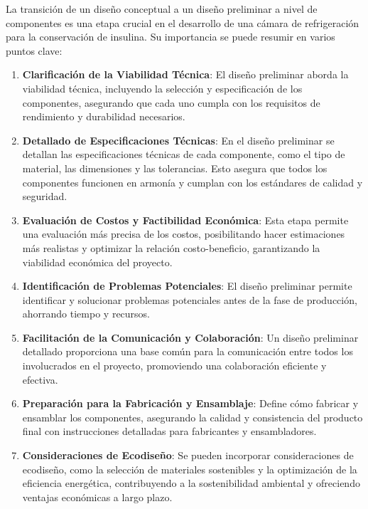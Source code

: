 La transición de un diseño conceptual a un diseño preliminar a nivel de componentes es una etapa crucial en el desarrollo de una cámara de refrigeración para la conservación de insulina. Su importancia se puede resumir en varios puntos clave:
\begin{enumerate}
	
	\item \textbf{Clarificación de la Viabilidad Técnica}: El diseño preliminar aborda la viabilidad técnica, incluyendo la selección y especificación de los componentes, asegurando que cada uno cumpla con los requisitos de rendimiento y durabilidad necesarios.
	
	\item  \textbf{Detallado de Especificaciones Técnicas}: En el diseño preliminar se detallan las especificaciones técnicas de cada componente, como el tipo de material, las dimensiones y las tolerancias. Esto asegura que todos los componentes funcionen en armonía y cumplan con los estándares de calidad y seguridad.
	
	\item  \textbf{Evaluación de Costos y Factibilidad Económica}: Esta etapa permite una evaluación más precisa de los costos, posibilitando hacer estimaciones más realistas y optimizar la relación costo-beneficio, garantizando la viabilidad económica del proyecto.
	
	\item \textbf{Identificación de Problemas Potenciales}: El diseño preliminar permite identificar y solucionar problemas potenciales antes de la fase de producción, ahorrando tiempo y recursos.
	
	\item  \textbf{Facilitación de la Comunicación y Colaboración}: Un diseño preliminar detallado proporciona una base común para la comunicación entre todos los involucrados en el proyecto, promoviendo una colaboración eficiente y efectiva.
	
	\item  \textbf{Preparación para la Fabricación y Ensamblaje}: Define cómo fabricar y ensamblar los componentes, asegurando la calidad y consistencia del producto final con instrucciones detalladas para fabricantes y ensambladores.
	
	\item  \textbf{Consideraciones de Ecodiseño}: Se pueden incorporar consideraciones de ecodiseño, como la selección de materiales sostenibles y la optimización de la eficiencia energética, contribuyendo a la sostenibilidad ambiental y ofreciendo ventajas económicas a largo plazo.
	
\end{enumerate}

